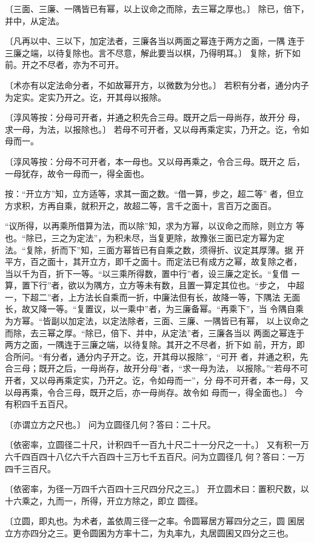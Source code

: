 \documentclass[a4paper,12pt,UTF8,twoside]{ctexbook}
\begin{document}
〔三面、三廉、一隅皆已有幂，以上议命之而除，去三幂之厚也。〕 除已，倍下，并中，从定法。

〔凡再以中、三以下，加定法者，三廉各当以两面之幂连于两方之面，一隅 连于三廉之端，以待复除也。言不尽意，解此要当以棋，乃得明耳。〕 复除，折下如前。开之不尽者，亦为不可开。

〔术亦有以定法命分者，不如故幂开方，以微数为分也。〕 若积有分者，通分内子为定实。定实乃开之。讫，开其母以报除。

〔淳风等按：分母可开者，并通之积先合三母。既开之后一母尚存，故开分 母，求一母，为法，以报除也。〕 若母不可开者，又以母再乘定实，乃开之。讫，令如母而一。

〔淳风等按：分母不可开者，本一母也。又以母再乘之，令合三母。既开之 后，一母犹存，故令一母而一，得全面也。

按：“开立方”知，立方适等，求其一面之数。“借一算，步之，超二等” 者，但立方求积，方再自乘，就积开之，故超二等，言千之面十，言百万之面百。

“议所得，以再乘所借算为法，而以除”知，求为方幂，以议命之而除，则立方 等也。“除已，三之为定法”，为积未尽，当复更除，故豫张三面已定方幂为定 法。“复除，折而下”知，三面方幂皆已有自乘之数，须得折、议定其厚薄。据 开平方，百之面十，其开立方，即千之面十。而定法已有成方之幂，故复除之者， 当以千为百，折下一等。“以三乘所得数，置中行”者，设三廉之定长。“复借 一算，置下行”者，欲以为隅方，立方等未有数，且置一算定其位也。“步之， 中超一，下超二”者，上方法长自乘而一折，中廉法但有长，故降一等，下隅法 无面长，故又降一等。“复置议，以一乘中”者，为三廉备幂。“再乘下”，当 令隅自乘为方幂。“皆副以加定法，以定法除者，三面、三廉、一隅皆已有幂， 以上议命之而除，去三幂之厚。“除已，倍下、并中，从定法”者，三廉各当以 两面之幂连于两方之面，一隅连于三廉之端，以待复除。其开之不尽者，折下如 前，开方，即合所问。“有分者，通分内子开之。讫，开其母以报除”，“可开 者，并通之积，先合三母；既开之后，一母尚存，故开分母”者，“求一母为法， 以报除。”“若母不可开者，又以母再乘定实，乃开之。讫，令如母而一”，分 母不可开者，本一母，又以母再乘，令合三母，既开之后，亦一母尚存。故令如 母而一，得全面也。〕 今有积四千五百尺。

〔亦谓立方之尺也。〕 问为立圆径几何？答曰：二十尺。

〔依密率，立圆径二十尺，计积四千一百九十尺二十一分尺之一十。〕 又有积一万六千四百四十八亿六千六百四十三万七千五百尺。问为立圆径几 何？答曰：一万四千三百尺。

〔依密率，为径一万四千六百四十三尺四分尺之三。〕 开立圆术曰：置积尺数，以十六乘之，九而一，所得，开立方除之，即立 圆径。

〔立圆，即丸也。为术者，盖依周三径一之率。令圆幂居方幂四分之三，圆 囷居立方亦四分之三。更令圆囷为方率十二，为丸率九，丸居圆囷又四分之三也。
\end{document}
